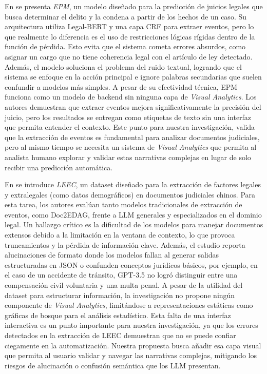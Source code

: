 En \cite{feng2022legal} se presenta \textit{EPM}, un modelo diseñado para la predicción de juicios legales que busca determinar el delito y la condena a partir de los hechos de un caso. Su arquitectura utiliza Legal-BERT y una capa \ac{CRF} para extraer eventos, pero lo que realmente lo diferencia es el uso de restricciones lógicas rígidas dentro de la función de pérdida. Esto evita que el sistema cometa errores absurdos, como asignar un cargo que no tiene coherencia legal con el artículo de ley detectado. Además, el modelo soluciona el problema del ruido textual, logrando que el sistema se enfoque en la acción principal e ignore palabras secundarias que suelen confundir a modelos más simples. A pesar de su efectividad técnica, EPM funciona como un modelo de backend sin ninguna capa de \textit{Visual Analytics}. Los autores demuestran que extraer eventos mejora significativamente la precisión del juicio, pero los resultados se entregan como etiquetas de texto sin una interfaz que permita entender el contexto. Este punto para nuestra investigación, valida que la extracción de eventos es fundamental para analizar documentos judiciales, pero al mismo tiempo se necesita un sistema de \textit{Visual Analytics} que permita al analista humano explorar y validar estas narrativas complejas en lugar de solo recibir una predicción automática.








En \cite{xue2024leec} se introduce \textit{LEEC}, un dataset diseñado para la extracción de factores legales y extralegales (como datos demográficos) en documentos judiciales chinos. Para esta tarea, los autores evalúan tanto modelos tradicionales de extracción de eventos, como Doc2EDAG, frente a \acs{LLM} generales y especializados en el dominio legal. Un hallazgo crítico es la dificultad de los modelos para manejar documentos extensos debido a la limitación en la ventana de contexto, lo que provoca truncamientos y la pérdida de información clave. Además, el estudio reporta alucinaciones de formato donde los modelos fallan al generar salidas estructuradas en \ac{JSON} o confunden conceptos jurídicos básicos, por ejemplo, en el caso de un accidente de tránsito, GPT-3.5 no logró distinguir entre una compensación civil voluntaria y una multa penal. A pesar de la utilidad del dataset para estructurar información, la investigación no propone ningún componente de \textit{Visual Analytics}, limitándose a representaciones estáticas como gráficas de bosque para el análisis estadístico. Esta falta de una interfaz interactiva es un punto importante para nuestra investigación, ya que los errores detectados en la extracción de LEEC demuestran que no se puede confiar ciegamente en la automatización. Nuestra propuesta busca añadir esa capa visual que permita al usuario validar y navegar las narrativas complejas, mitigando los riesgos de alucinación o confusión semántica que los \acs{LLM} presentan.










